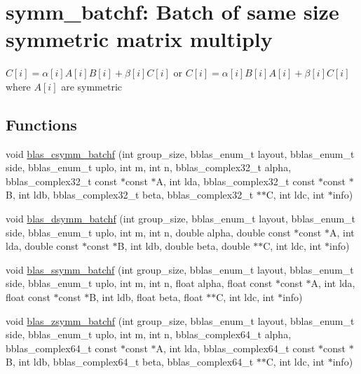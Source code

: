 \hypertarget{group__symm__batchf}{}\section{symm\+\_\+batchf\+: Batch of same size symmetric matrix multiply}
\label{group__symm__batchf}


$ C[i] = \alpha[i] A[i] B[i] + \beta[i] C[i] $ or $ C[i] = \alpha[i] B[i] A[i] + \beta[i] C[i] $ where $ A[i] $ are symmetric  


\subsection*{Functions}
\begin{DoxyCompactItemize}
\item 
void \hyperlink{group__symm__batchf_ga3b7888d0a43cf26d146581c2615897e5}{blas\+\_\+csymm\+\_\+batchf} (int group\+\_\+size, bblas\+\_\+enum\+\_\+t layout, bblas\+\_\+enum\+\_\+t side, bblas\+\_\+enum\+\_\+t uplo, int m, int n, bblas\+\_\+complex32\+\_\+t alpha, bblas\+\_\+complex32\+\_\+t const $\ast$const $\ast$A, int lda, bblas\+\_\+complex32\+\_\+t const $\ast$const $\ast$B, int ldb, bblas\+\_\+complex32\+\_\+t beta, bblas\+\_\+complex32\+\_\+t $\ast$$\ast$C, int ldc, int $\ast$info)
\item 
void \hyperlink{group__symm__batchf_gac8e8bd6f38e2584eef2162a6f5b6464e}{blas\+\_\+dsymm\+\_\+batchf} (int group\+\_\+size, bblas\+\_\+enum\+\_\+t layout, bblas\+\_\+enum\+\_\+t side, bblas\+\_\+enum\+\_\+t uplo, int m, int n, double alpha, double const $\ast$const $\ast$A, int lda, double const $\ast$const $\ast$B, int ldb, double beta, double $\ast$$\ast$C, int ldc, int $\ast$info)
\item 
void \hyperlink{group__symm__batchf_gad73d6157baa333e8b81127d9fb0e73c7}{blas\+\_\+ssymm\+\_\+batchf} (int group\+\_\+size, bblas\+\_\+enum\+\_\+t layout, bblas\+\_\+enum\+\_\+t side, bblas\+\_\+enum\+\_\+t uplo, int m, int n, float alpha, float const $\ast$const $\ast$A, int lda, float const $\ast$const $\ast$B, int ldb, float beta, float $\ast$$\ast$C, int ldc, int $\ast$info)
\item 
void \hyperlink{group__symm__batchf_ga207ca7335041928197b6c1739e40cd46}{blas\+\_\+zsymm\+\_\+batchf} (int group\+\_\+size, bblas\+\_\+enum\+\_\+t layout, bblas\+\_\+enum\+\_\+t side, bblas\+\_\+enum\+\_\+t uplo, int m, int n, bblas\+\_\+complex64\+\_\+t alpha, bblas\+\_\+complex64\+\_\+t const $\ast$const $\ast$A, int lda, bblas\+\_\+complex64\+\_\+t const $\ast$const $\ast$B, int ldb, bblas\+\_\+complex64\+\_\+t beta, bblas\+\_\+complex64\+\_\+t $\ast$$\ast$C, int ldc, int $\ast$info)
\end{DoxyCompactItemize}


